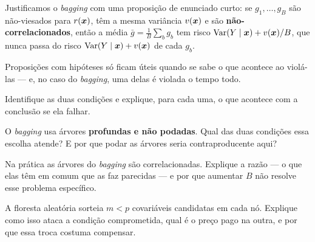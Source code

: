 Justificamos o \emph{bagging} com uma proposição de enunciado curto: se
$g_1,\dots,g_B$ são não-viesados para $r(\bm{x})$, têm a mesma variância $v(\bm{x})$ e são
\textbf{não-correlacionados}, então a média $\bar g=\frac1B\sum_b g_b$ tem risco
$\operatorname{Var}(Y\mid\bm{x})+v(\bm{x})/B$, que nunca passa do risco $\operatorname{Var}(Y\mid\bm{x})+v(\bm{x})$ de cada
$g_b$.

Proposições com hipóteses só ficam úteis quando se sabe o que acontece ao violá-las
--- e, no caso do \emph{bagging}, uma delas é violada o tempo todo.
\begin{itens}
  \item {} Identifique as duas condições e explique, para cada uma, o que
        acontece com a conclusão se ela falhar.
  \item {} O \emph{bagging} usa árvores \textbf{profundas e não podadas}.
        Qual das duas condições essa escolha atende? E por que podar as árvores
        seria contraproducente aqui?
  \item {} Na prática as árvores do \emph{bagging} são correlacionadas.
        Explique a razão --- o que elas têm em comum que as faz parecidas --- e
        por que aumentar $B$ não resolve esse problema específico.
  \item {} A floresta aleatória sorteia $m<p$ covariáveis candidatas em
        cada nó. Explique como isso ataca a condição comprometida, qual é o preço
        pago na outra, e por que essa troca costuma compensar.
\end{itens}


